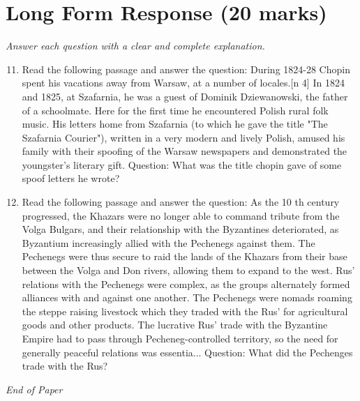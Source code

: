 \documentclass[12pt]{article}
\begin{document}
\section*{Long Form Response (20 marks)}
\textit{Answer each question with a clear and complete explanation.}
\begin{enumerate}[label=\arabic*.]
\setcounter{enumi}{10}
\item Read the following passage and answer the question: During 1824-28 Chopin spent his vacations away from Warsaw, at a number of locales.[n 4] In 1824 and 1825, at Szafarnia, he was a guest of Dominik Dziewanowski, the father of a schoolmate. Here for the first time he encountered Polish rural folk music. His letters home from Szafarnia (to which he gave the title "The Szafarnia Courier"), written in a very modern and lively Polish, amused his family with their spoofing of the Warsaw newspapers and demonstrated the youngster's literary gift. Question: What was the title chopin gave of some spoof letters he wrote?
\item Read the following passage and answer the question: As the 10 th century progressed, the Khazars were no longer able to command tribute from the Volga Bulgars, and their relationship with the Byzantines deteriorated, as Byzantium increasingly allied with the Pechenegs against them. The Pechenegs were thus secure to raid the lands of the Khazars from their base between the Volga and Don rivers, allowing them to expand to the west. Rus' relations with the Pechenegs were complex, as the groups alternately formed alliances with and against one another. The Pechenegs were nomads roaming the steppe raising livestock which they traded with the Rus' for agricultural goods and other products. The lucrative Rus' trade with the Byzantine Empire had to pass through Pecheneg-controlled territory, so the need for generally peaceful relations was essentia... Question: What did the Pechenges trade with the Rus?
\end{enumerate}

\vfill
\noindent\textit{End of Paper}
\end{document}
